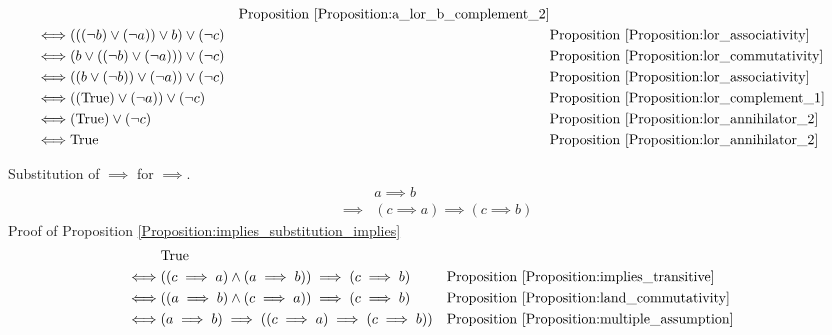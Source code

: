 \begin{prop}
\begin{align*}
& & \text{Proposition \ref{Proposition:a_lor_b_complement_2}} \\
\iff & (((\lnot b) \lor (\lnot a)) \lor b) \lor (\lnot c)
& & \text{Proposition \ref{Proposition:lor_associativity}} \\
\iff & (b \lor ((\lnot b) \lor (\lnot a))) \lor (\lnot c)
& & \text{Proposition \ref{Proposition:lor_commutativity}} \\
\iff & ((b \lor (\lnot b)) \lor (\lnot a)) \lor (\lnot c)
& & \text{Proposition \ref{Proposition:lor_associativity}} \\
\iff & ((\text{True}) \lor (\lnot a)) \lor (\lnot c)
& & \text{Proposition \ref{Proposition:lor_complement_1}} \\
\iff & (\text{True}) \lor (\lnot c)
& & \text{Proposition \ref{Proposition:lor_annihilator_2}} \\
\iff & \text{True}
& & \text{Proposition \ref{Proposition:lor_annihilator_2}} \\
\end{align*}
\end{prop}

\begin{prop}
\label{Proposition:implies_substitution_implies}
Substitution of $\implies$ for $\implies$.
\begin{align*}
& a \implies b \\
\implies & (c \implies a) \implies (c \implies b)
\end{align*}
Proof of Proposition \ref{Proposition:implies_substitution_implies}
\begin{align*}
& \text{True} \\
\iff & ((c \implies a) \land (a \implies b)) \implies (c \implies b)
& & \text{Proposition \ref{Proposition:implies_transitive}} \\
\iff & ((a \implies b) \land (c \implies a)) \implies (c \implies b)
& & \text{Proposition \ref{Proposition:land_commutativity}} \\
\iff & (a \implies b) \implies ((c \implies a) \implies (c \implies b))
& & \text{Proposition \ref{Proposition:multiple_assumption}} \\
\end{align*}
\end{prop}

